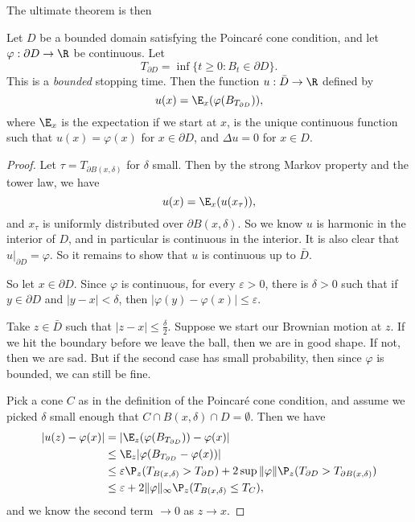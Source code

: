 \documentclass[a4paper]{article}
\begin{document}
The ultimate theorem is then
\begin{thm}
  Let $D$ be a bounded domain satisfying the Poincar\'e cone condition, and let $\varphi: \partial D \to \R$ be continuous. Let
  \[
    T_{\partial D} = \inf\{ t \geq 0 : B_t \in \partial D \}.
  \]
  This is a \emph{bounded} stopping time. Then the function $u: \bar{D} \to \R$ defined by
  \[
    u(x) = \E_x (\varphi(B_{T_{\partial D}})),
  \]
  where $\E_x$ is the expectation if we start at $x$, is the unique continuous function such that $u(x) = \varphi(x)$ for $x \in \partial D$, and $\Delta u = 0$ for $x \in D$.
\end{thm}

\begin{proof}
  Let $\tau = T_{\partial B(x, \delta)}$ for $\delta$ small. Then by the strong Markov property and the tower law, we have
  \[
    u(x) = \E_x(u(x_\tau)),
  \]
  and $x_\tau$ is uniformly distributed over $\partial B(x, \delta)$. So we know $u$ is harmonic in the interior of $D$, and in particular is continuous in the interior. It is also clear that $u|_{\partial D} = \varphi$. So it remains to show that $u$ is continuous up to $\bar{D}$.

  So let $x \in \partial D$. Since $\varphi$ is continuous, for every $\varepsilon > 0$, there is $\delta > 0$ such that if $y \in \partial D$ and $|y - x| < \delta$, then $|\varphi(y) - \varphi(x)| \leq \varepsilon$.

  Take $z \in \bar{D}$ such that $|z - x| \leq \frac{\delta}{2}$. Suppose we start our Brownian motion at $z$. If we hit the boundary before we leave the ball, then we are in good shape. If not, then we are sad. But if the second case has small probability, then since $\varphi$ is bounded, we can still be fine.

  Pick a cone $C$ as in the definition of the Poincar\'e cone condition, and assume we picked $\delta$ small enough that $C \cap B(x, \delta) \cap D = \emptyset$. Then we have
  \begin{align*}
    |u(z) - \varphi(x)| &= |\E_z(\varphi(B_{T_{\partial D}})) - \varphi(x)|\\
    &\leq \E_z |\varphi(B_{T_{\partial D}} - \varphi(x))|\\
    &\leq \varepsilon \P_z(T_{B(x, \delta)} > T_{\partial D}) + 2 \sup \|\varphi\| \P_z(T_{\partial D} > T_{\partial B(x, \delta)})\\
    &\leq \varepsilon + 2 \|\varphi\|_{\infty} \P_z(T_{B(x, \delta)} \leq T_C),
  \end{align*}
  and we know the second term $\to 0$ as $z \to x$.
\end{proof}
\end{document}
